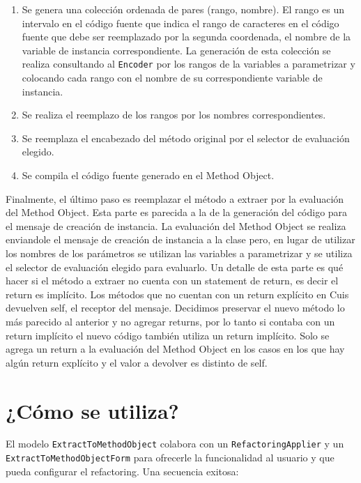 \begin{enumerate}
    \item Se genera una colección ordenada de pares (rango, nombre). El rango es un intervalo en el
    código fuente que indica el rango de caracteres en el código fuente que debe ser reemplazado por
    la segunda coordenada, el nombre de la variable de instancia correspondiente. La generación de
    esta colección se realiza consultando al \lstinline{Encoder} por los rangos de la variables a
    parametrizar y colocando cada rango con el nombre de su correspondiente variable de instancia.
    \item Se realiza el reemplazo de los rangos por los nombres correspondientes.
    \item Se reemplaza el encabezado del método original por el selector de evaluación elegido.
    \item Se compila el código fuente generado en el Method Object.
\end{enumerate}

Finalmente, el último paso es reemplazar el método a extraer por la evaluación del Method Object.
Esta parte es parecida a la de la generación del código para el mensaje de creación de instancia. La
evaluación del Method Object se realiza enviandole el mensaje de creación de instancia a la clase
pero, en lugar de utilizar los nombres de los parámetros se utilizan las variables a parametrizar y
se utiliza el selector de evaluación elegido para evaluarlo. Un detalle de esta parte es qué hacer
si el método a extraer no cuenta con un statement de return, es decir el return es implícito. Los
métodos que no cuentan con un return explícito en Cuis devuelven self, el receptor del mensaje.
Decidimos preservar el nuevo método lo más parecido al anterior y no agregar returns, por lo tanto
si contaba con un return implícito el nuevo código también utiliza un return implícito. Solo se
agrega un return a la evaluación del Method Object en los casos en los que hay algún return
explícito y el valor a devolver es distinto de self.



\section{¿Cómo se utiliza?}

El modelo \lstinline{ExtractToMethodObject} colabora con un \lstinline{RefactoringApplier} y un
\lstinline{ExtractToMethodObjectForm} para ofrecerle la funcionalidad al usuario y que pueda configurar
el refactoring. Una secuencia exitosa:

